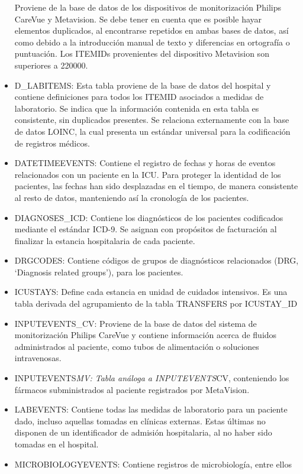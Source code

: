 \documentclass{report}
\begin{document}
\begin{itemize}
  Proviene de la base de datos de los dispositivos de monitorización
  Philips CareVue y Metavision. Se debe tener en cuenta que es posible
  hayar elementos duplicados, al encontrarse repetidos en ambas bases de
  datos, así como debido a la introducción manual de texto y diferencias
  en ortografía o puntuación. Los ITEMIDs provenientes del dispositivo
  Metavision son superiores a 220000.
\item
  D\_LABITEMS: Esta tabla proviene de la base de datos del hospital y
  contiene definiciones para todos los ITEMID asociados a medidas de
  laboratorio. Se indica que la información contenida en esta tabla es
  consistente, sin duplicados presentes. Se relaciona externamente con
  la base de datos LOINC, la cual presenta un estándar universal para la
  codificación de registros médicos. 
\item
  DATETIMEEVENTS: Contiene el registro de fechas y horas de eventos
  relacionados con un paciente en la ICU. Para proteger la identidad de
  los pacientes, las fechas han sido desplazadas en el tiempo, de manera
  consistente al resto de datos, manteniendo así la cronología de los
  pacientes. 
\item
  DIAGNOSES\_ICD: Contiene los diagnósticos de los pacientes codificados
  mediante el estándar ICD-9. Se asignan con propósitos de facturación
  al finalizar la estancia hospitalaria de cada paciente. 
\item
  DRGCODES: Contiene códigos de grupos de diagnósticos relacionados
  (DRG, `Diagnosis related groups'), para los pacientes.
\item
  ICUSTAYS: Define cada estancia en unidad de cuidados intensivos. Es
  una tabla derivada del agrupamiento de la tabla TRANSFERS por
  ICUSTAY\_ID
\item
  INPUTEVENTS\_CV: Proviene de la base de datos del sistema de
  monitorización Philips CareVue y contiene información acerca de
  fluidos administrados al paciente, como tubos de alimentación o
  soluciones intravenosas. 
\item
  INPUTEVENTS\emph{MV: Tabla análoga a INPUTEVENTS}CV, conteniendo los
  fármacos subministrados al paciente registrados por MetaVision.
\item
  LABEVENTS: Contiene todas las medidas de laboratorio para un paciente
  dado, incluso aquellas tomadas en clínicas externas. Estas últimas no
  disponen de un identificador de admisión hospitalaria, al no haber
  sido tomadas en el hospital.
\item
  MICROBIOLOGYEVENTS: Contiene registros de microbiología, entre ellos

\end{itemize}
\end{document}
